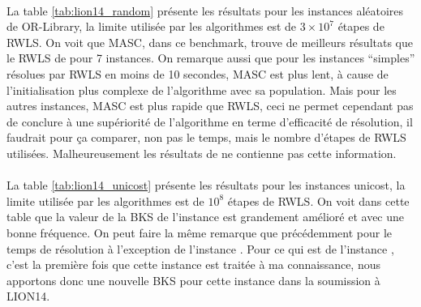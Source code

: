 \documentclass[a4paper,11pt,twoside,french,report]{../common/simplem}
\begin{document}
				\paragraph*{}
					La table \ref{tab:lion14_random} présente les résultats pour les instances aléatoires de OR-Library, la limite utilisée par les algorithmes est de \(3 \times 10^7\) étapes de \gls{RWLS}. On voit que \gls{MASC}, dans ce benchmark, trouve de meilleurs résultats que le \gls{RWLS} de \cite{Gao2015} pour 7 instances. On remarque aussi que pour les instances ``simples'' résolues par \gls{RWLS} en moins de 10 secondes, \gls{MASC} est plus lent, à cause de l'initialisation plus complexe de l'algorithme avec sa population. Mais pour les autres instances, \gls{MASC} est plus rapide que \gls{RWLS}, ceci ne permet cependant pas de conclure à une supériorité de l'algorithme en terme d'efficacité de résolution, il faudrait pour ça comparer, non pas le temps, mais le nombre d'étapes de \gls{RWLS} utilisées. Malheureusement les résultats de \cite{Gao2015} ne contienne pas cette information.
				\paragraph*{}
					La table \ref{tab:lion14_unicost} présente les résultats pour les instances unicost, la limite utilisée par les algorithmes est de \(10^8\) étapes de \gls{RWLS}. On voit dans cette table que la valeur de la \gls{BKS} de l'instance  est grandement amélioré et avec une bonne fréquence. On peut faire la même remarque que précédemment pour le temps de résolution à l'exception de l'instance . Pour ce qui est de l'instance , c'est la première fois que cette instance est traitée à ma connaissance, nous apportons donc une nouvelle \gls{BKS} pour cette instance dans la soumission à \acrshort{LION14}.
				\paragraph*{}
					
				\paragraph*{}
					
\end{document}
